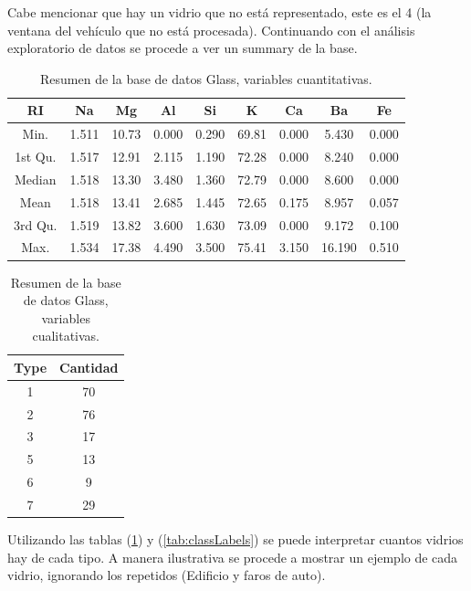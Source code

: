 Cabe mencionar que hay un vidrio que no está representado, este es el 4 (la ventana del vehículo que no está procesada).
Continuando con el análisis exploratorio de datos se procede a ver un summary de la base.
\begin{table}[h]
    \centering
    \begin{tabular}{|c|c|c|c|c|c|c|c|c|}
    \hline
    RI & Na & Mg & Al & Si & K & Ca & Ba & Fe \\ \hline
    Min. & 1.511 & 10.73 & 0.000 & 0.290 & 69.81 & 0.000 & 5.430 & 0.000 \\ \hline
    1st Qu. & 1.517 & 12.91 & 2.115 & 1.190 & 72.28 & 0.000 & 8.240 & 0.000 \\ \hline
    Median & 1.518 & 13.30 & 3.480 & 1.360 & 72.79 & 0.000 & 8.600 & 0.000 \\ \hline
    Mean & 1.518 & 13.41 & 2.685 & 1.445 & 72.65 & 0.175 & 8.957 & 0.057 \\ \hline
    3rd Qu. & 1.519 & 13.82 & 3.600 & 1.630 & 73.09 & 0.000 & 9.172 & 0.100 \\ \hline
    Max. & 1.534 & 17.38 & 4.490 & 3.500 & 75.41 & 3.150 & 16.190 & 0.510 \\ \hline
    \end{tabular}
    \caption{Resumen de la base de datos Glass, variables cuantitativas.}
\end{table}

\begin{table}[H]
    \centering
    \begin{tabular}{|c|c|}
    \hline
    Type & Cantidad \\ \hline
    1 & 70 \\
    2 & 76 \\
    3 & 17 \\
    5 & 13 \\
    6 & 9 \\
    7 & 29 \\ \hline
    \end{tabular}
    \caption{Resumen de la base de datos Glass, variables cualitativas.}
     \label{tabCualitativa}
\end{table}
Utilizando las tablas ({\ref{tabCualitativa}}) y ({\ref{tab:classLabels}}) se puede interpretar cuantos vidrios hay de cada tipo.
A manera ilustrativa se procede a mostrar un ejemplo de cada vidrio, ignorando los repetidos (Edificio y faros de auto).

